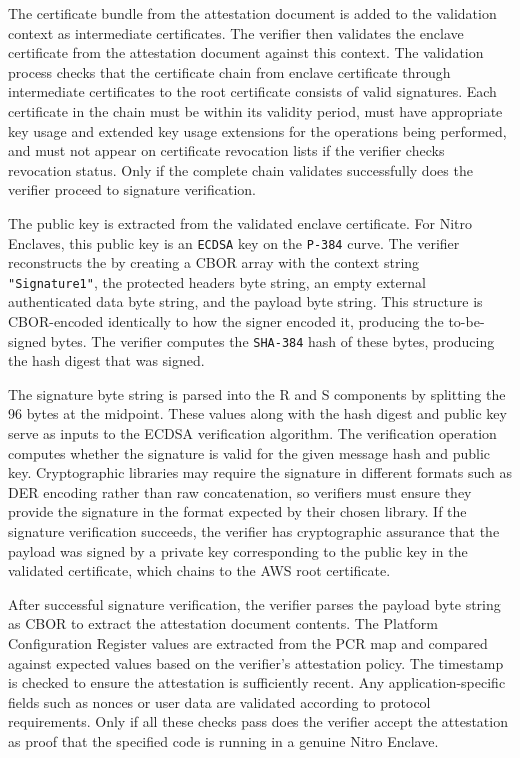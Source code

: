 The certificate bundle from the attestation document is added to the validation context as intermediate certificates. The verifier then validates the enclave certificate from the attestation document against this context. The validation process checks that the certificate chain from enclave certificate through intermediate certificates to the root certificate consists of valid signatures. Each certificate in the chain must be within its validity period, must have appropriate key usage and extended key usage extensions for the operations being performed, and must not appear on certificate revocation lists if the verifier checks revocation status. Only if the complete chain validates successfully does the verifier proceed to signature verification.

The public key is extracted from the validated enclave certificate. For Nitro Enclaves, this public key is an \texttt{ECDSA} key on the \texttt{P-384} curve. The verifier reconstructs the \texttt{} by creating a CBOR array with the context string \texttt{"Signature1"}, the protected headers byte string, an empty external authenticated data byte string, and the payload byte string. This structure is CBOR-encoded identically to how the signer encoded it, producing the to-be-signed bytes. The verifier computes the \texttt{SHA-384} hash of these bytes, producing the hash digest that was signed.


The signature byte string is parsed into the R and S components by splitting the 96 bytes at the midpoint. These values along with the hash digest and public key serve as inputs to the ECDSA verification algorithm. The verification operation computes whether the signature is valid for the given message hash and public key. Cryptographic libraries may require the signature in different formats such as DER encoding rather than raw concatenation, so verifiers must ensure they provide the signature in the format expected by their chosen library. If the signature verification succeeds, the verifier has cryptographic assurance that the payload was signed by a private key corresponding to the public key in the validated certificate, which chains to the AWS root certificate.

After successful signature verification, the verifier parses the payload byte string as CBOR to extract the attestation document contents. The Platform Configuration Register values are extracted from the PCR map and compared against expected values based on the verifier's attestation policy. The timestamp is checked to ensure the attestation is sufficiently recent. Any application-specific fields such as nonces or user data are validated according to protocol requirements. Only if all these checks pass does the verifier accept the attestation as proof that the specified code is running in a genuine Nitro Enclave.

